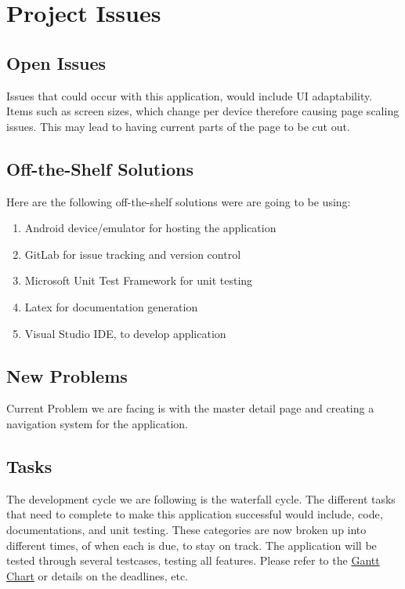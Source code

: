 \documentclass[12pt, titlepage]{article}
\begin{document}
\section{Project Issues}

\subsection{Open Issues}
Issues that could occur with this application, would include UI adaptability. Items such as screen sizes, which change per device therefore causing page scaling issues. This may lead to having current parts of the page to be cut out. 

\subsection{Off-the-Shelf Solutions}
Here are the following off-the-shelf solutions were are going to be using: 
   \begin{enumerate}
     \item Android device/emulator for hosting the application 
     \item GitLab for issue tracking and version control
	\item Microsoft Unit Test Framework for unit testing 
	 \item Latex for documentation generation
	\item Visual Studio IDE, to develop application

   \end{enumerate}

\subsection{New Problems}
Current Problem we are facing is with the master detail page and creating a navigation system for the application.
\subsection{Tasks}
The development cycle we are following is the waterfall cycle. The different tasks that need to complete to make this application successful would include, code, documentations, and unit testing. These categories are now broken up into different times, of when each is due, to stay on track. The application will be tested through several testcases, testing all features. Please refer to the \href{run:../../ProjectSchedule/Team 12 Gantt Chart.gan}{Gantt Chart} or details on the deadlines, etc.
\end{document}
